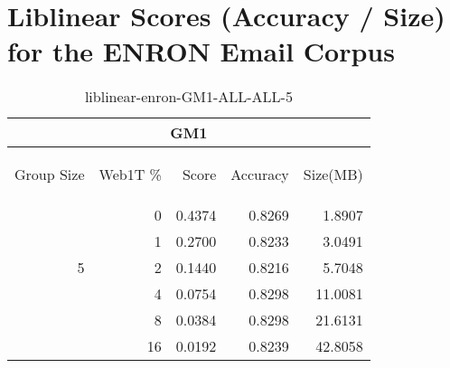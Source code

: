 \chapter{Liblinear Scores (Accuracy / Size) for the ENRON Email Corpus}
\begin{center}
\begin{table}[htbp] 
 \begin{center}
\begin{tabular}{ | r | r | r | r | r |}
\hline
\multicolumn{5}{|c|}{GM1}\\
\hline
\begin{sideways}Group Size\end{sideways} & \begin{sideways}Web1T \%\end{sideways} & \begin{sideways}Score\end{sideways} & \begin{sideways}Accuracy\end{sideways} & \begin{sideways}Size(MB)\end{sideways}\\
\hline
\multirow{5}{*}{5}
 & 0 & 0.4374 & 0.8269 & 1.8907\\ \cline{2-5}
 & 1 & 0.2700 & 0.8233 & 3.0491\\ \cline{2-5}
 & 2 & 0.1440 & 0.8216 & 5.7048\\ \cline{2-5}
 & 4 & 0.0754 & 0.8298 & 11.0081\\ \cline{2-5}
 & 8 & 0.0384 & 0.8298 & 21.6131\\ \cline{2-5}
 & 16 & 0.0192 & 0.8239 & 42.8058\\ \cline{2-5}
\hline
\end{tabular}
\caption{liblinear-enron-GM1-ALL-ALL-5}
\label{table:liblinear-enron-GM1-ALL-ALL-5}
\end{center}
 \end{table}
\end{center}

